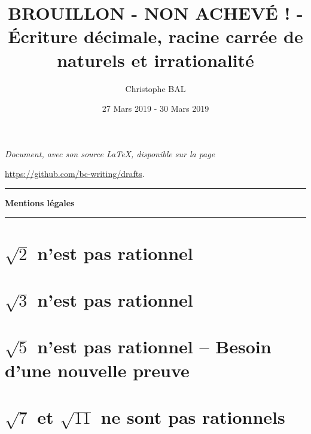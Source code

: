 \documentclass[12pt]{amsart}
\begin{document}
\title{BROUILLON - NON ACHEVÉ ! - Écriture décimale, racine carrée de naturels et irrationalité}
\author{Christophe BAL}
\date{27 Mars 2019 - 30 Mars 2019}

\maketitle

\begin{center}
	\itshape
	Document, avec son source \LaTeX, disponible sur la page
	
	\url{https://github.com/bc-writing/drafts}.
\end{center}


\bigskip


\begin{center}
	\hrule\vspace{.3em}
	{
		\fontsize{1.35em}{1em}\selectfont
		\textbf{Mentions \og légales \fg}
	}
			
	\vspace{0.45em}
	\doclicenseThis
	\hrule
\end{center}


\setcounter{tocdepth}{2}
\tableofcontents



\section{$\sqrt2$ n'est pas rationnel}





\section{$\sqrt3$ n'est pas rationnel}




\section{$\sqrt5$ n'est pas rationnel -- Besoin d'une nouvelle preuve}





\section{$\sqrt7$ et $\sqrt{11}$ ne sont pas rationnels}
\end{document}
